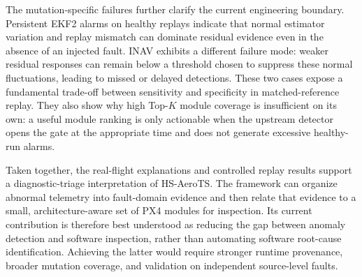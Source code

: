 The mutation-specific failures further clarify the current engineering boundary. Persistent EKF2 alarms on healthy replays indicate that normal estimator variation and replay mismatch can dominate residual evidence even in the absence of an injected fault. INAV exhibits a different failure mode: weaker residual responses can remain below a threshold chosen to suppress these normal fluctuations, leading to missed or delayed detections. These two cases expose a fundamental trade-off between sensitivity and specificity in matched-reference replay. They also show why high Top-$K$ module coverage is insufficient on its own: a useful module ranking is only actionable when the upstream detector opens the gate at the appropriate time and does not generate excessive healthy-run alarms.

Taken together, the real-flight explanations and controlled replay results support a diagnostic-triage interpretation of HS-AeroTS. The framework can organize abnormal telemetry into fault-domain evidence and then relate that evidence to a small, architecture-aware set of PX4 modules for inspection. Its current contribution is therefore best understood as reducing the gap between anomaly detection and software inspection, rather than automating software root-cause identification. Achieving the latter would require stronger runtime provenance, broader mutation coverage, and validation on independent source-level faults.
